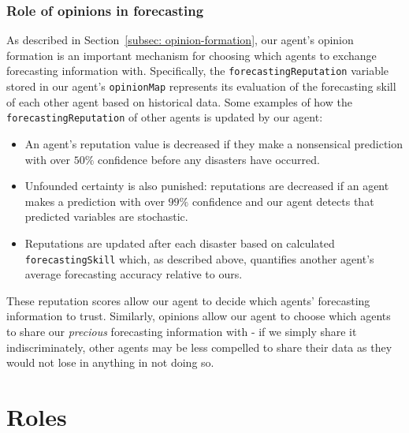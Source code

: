 \subsubsection{Role of opinions in forecasting}
As described in Section~\ref{subsec: opinion-formation}, our agent's opinion formation is an important mechanism for choosing which agents to exchange forecasting information with. Specifically, the \texttt{forecastingReputation} variable stored in our agent's \texttt{opinionMap} represents its evaluation of the forecasting skill of each other agent based on historical data. Some examples of how the \texttt{forecastingReputation} of other agents is updated by our agent:
\begin{itemize}
    \item An agent's reputation value is decreased if they make a nonsensical prediction with over $50\%$ confidence before any disasters have occurred.
    \item Unfounded certainty is also punished: reputations are decreased if an agent makes a prediction with over $99\%$ confidence and our agent detects that predicted variables are stochastic.
    \item Reputations are updated after each disaster based on calculated \texttt{forecastingSkill} which, as described above, quantifies another agent's average forecasting accuracy relative to ours. 
\end{itemize}

These reputation scores allow our agent to decide which agents' forecasting information to trust. Similarly, opinions allow our agent to choose which agents to share our \textit{precious} forecasting information with - if we simply share it indiscriminately, other agents may be less compelled to share their data as they would not lose in anything in not doing so. 

\section{Roles}
